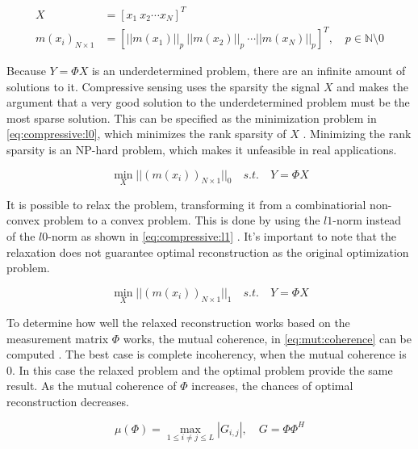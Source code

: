 \begin{equation} \label{eq:sparsity:measure}
  \begin{split}
      X &= [x_1\ x_2 \cdots x_N]^T \\
      m(x_i)_{N \times 1} &= [||m(x_1)||_p\ ||m(x_2)||_p\ \cdots ||m(x_N)||_p]^T,\quad p \in \mathbb{N}\setminus 0
  \end{split}
\end{equation}

Because $Y = \Phi X$ is an underdetermined problem, there are an infinite amount of solutions to it. Compressive sensing uses the sparsity the signal $X$ and makes the argument that a very good solution to the underdetermined problem must be the most sparse solution. This can be specified as the minimization problem in \eqref{eq:compressive:l0}, which minimizes the rank sparsity of $X$ \cite{chen:mmv}. Minimizing the rank sparsity is an NP-hard problem, which makes it unfeasible in real applications.

\begin{equation} \label{eq:compressive:l0}
  \min_{X} || (m(x_i))_{N \times 1} ||_0 \quad s.t. \quad Y = \Phi X
\end{equation}

It is possible to relax the problem, transforming it from a combinatiorial non-convex problem to a convex problem. This is done by using the $l1$-norm instead of the $l0$-norm as shown in \eqref{eq:compressive:l1} \cite{chen:mmv}. It's important to note that the relaxation does not guarantee optimal reconstruction as the original optimization problem. 

\begin{equation} \label{eq:compressive:l1}
    \min_{X} || (m(x_i))_{N \times 1} ||_1 \quad s.t. \quad Y = \Phi X
\end{equation}

To determine how well the relaxed reconstruction works based on the measurement matrix $\Phi$ works, the mutual coherence, in \eqref{eq:mut:coherence} can be computed \cite{chen:mmv}. The best case is complete incoherency, when the mutual coherence is 0. In this case the relaxed problem and the optimal problem provide the same result. As the mutual coherence of $\Phi$ increases, the chances of optimal reconstruction decreases.

\begin{equation} \label{eq:mut:coherence}
    \mu(\Phi) = \max_{1 \le i \neq j \le L} | G_{i,j} |,\quad G = \Phi\Phi^H
\end{equation}

